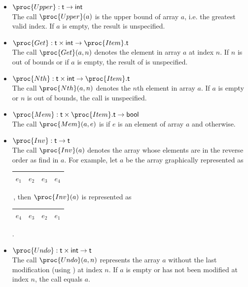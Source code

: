 \documentclass[11pt,a4paper]{article}
\newcommand\type[1]{\textsf{#1}}
\begin{document}
\begin{itemize}
\begin{itemize}
    \item \(\proc{Upper} : \type{t} \rightarrow \type{int}\)\\
    The call \(\proc{Upper} (a)\) is the upper bound of array
    \(a\), i.e. the greatest valid index. If \(a\) is empty, the
    result is unspecified.

    \item \(\proc{Get} : \type{t} \times \type{int} \rightarrow
    \proc{Item}.\type{t}\)\\
    The call \(\proc{Get} (a, n)\) denotes the element in
    array \(a\) at index \(n\). If \(n\) is out of bounds or if
    \(a\) is empty, the result of  is unspecified.

    \item \(\proc{Nth} : \type{t} \times \type{int} \rightarrow
      \proc{Item}.\type{t}\)\\ The call \(\proc{Nth}(a,n)\) denotes
      the \(n\)th element in array \(a\). If \(a\) is empty or \(n\)
      is out of bounds, the call is unspecified.

    \item \(\proc{Mem} : \type{t} \times \proc{Item}.\type{t}
    \rightarrow \type{bool}\)\\
    The call \(\proc{Mem}(a,e)\) is  if \(e\) is an element
    of array \(a\) and  otherwise.

    \item \(\proc{Inv} : \type{t} \rightarrow \type{t}\)\\
    The call \(\proc{Inv} (a)\) denotes the array whose elements are
    in the reverse order as find in \(a\). For example, let \(a\) be
    the array graphically represented as
    \begin{tabular}{|c|c|c|c|}\hline\(e_1\) & \(e_2\) &
    \(e_3\) & \(e_4\)\\\hline\end{tabular}\,, then \(\proc{Inv}(a)\) is
    represented as \begin{tabular}{|c|c|c|c|}\hline\(e_4\) & \(e_3\)
    & \(e_2\) & \(e_1\)\\\hline\end{tabular}.

    \item \(\proc{Undo} : \type{t} \times \type{int} \rightarrow
    \type{t}\)\\
    The call \(\proc{Undo}(a,n)\) represents the array \(a\) without
    the last modification (using ) at index \(n\). If \(a\)
    is empty or has not been modified at index \(n\), the call equals
    \(a\).

  \end{itemize}

\end{itemize}



\end{document}
